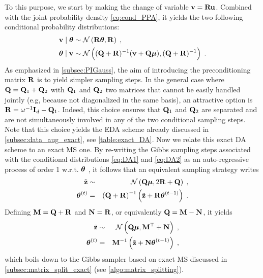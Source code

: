 \documentclass[nohypdvips,onefignum,onetabnum]{siamart171218}
\begin{document}
To this purpose, we start by making the change of variable $\mathbf{v} = \mathbf{Ru}$. Combined with the joint probability density \cref{eq:cond_PPA}, it yields the two following conditional probability distributions:
\begin{align}
  \B{v}\mid\Bs{\theta} &\sim \mathcal{N}\pr{\B{R}\Bs{\theta},\B{R}}\eqsp, \label{eq:DA1}\\
  \Bs{\theta}\mid\B{v} &\sim \mathcal{N}\pr{(\B{Q} + \B{R})^{-1}(\B{v}+\B{Q}\Bs{\mu}),(\B{Q} + \B{R})^{-1}}\eqsp.\label{eq:DA2}
\end{align}
As emphasized in \cref{subsec:PIGauss}, the aim of introducing the preconditioning matrix $\mathbf{R}$ is to yield simpler sampling steps.
In the general case where $\mathbf{Q} = \mathbf{Q}_1 + \mathbf{Q}_2$ with $\mathbf{Q}_1$ and $\mathbf{Q}_2$ two matrices that cannot be easily handled jointly (e.g, because not diagonalized in the same basis),
an attractive option is $\mathbf{R} = \omega^{-1}\mathbf{I}_d - \mathbf{Q}_1$.
Indeed, this choice ensures that $\mathbf{Q}_1$ and $\mathbf{Q}_2$ are separated and are not simultaneously involved in any of the two conditional sampling steps.
Note that this choice yields the EDA scheme already discussed in \cref{subsec:data_aug_exact}, see \cref{table:exact_DA}.
%
Now we relate this exact DA scheme to an exact MS one. 
By re-writing the Gibbs sampling steps associated with the conditional distributions \cref{eq:DA1} and \cref{eq:DA2} as an auto-regressive process of order 1 w.r.t. $\boldsymbol{\theta}$ \cite{Box1994}, it follows that an equivalent sampling strategy writes 
\begin{eqnarray}
  \tilde{\mathbf{z}} &\sim & \mathcal{N}\left(\mathbf{Q}\boldsymbol{\mu}, 2\mathbf{R} + \mathbf{Q}\right)\;,\\
  \boldsymbol{\theta}^{(t)} & = & \left(\mathbf{Q}+\mathbf{R}\right)^{-1}\left(\tilde{\mathbf{z}}+\mathbf{R}\boldsymbol{\theta}^{(t-1)}\right)\;.
\end{eqnarray}
Defining $\mathbf{M} = \mathbf{Q}+\mathbf{R}$ and $\mathbf{N} = \mathbf{R}$, or equivalently $\mathbf{Q} = \mathbf{M} - \mathbf{N}$, it yields  
\begin{eqnarray}
    \tilde{\B{z}} & \sim & \mathcal{N}\pr{\B{Q}\Bs{\mu}, \B{M}^{\top} + \B{N}}\eqsp,\label{eq:z}\\
    \Bs{\theta}^{(t)} & = & \B{M}^{-1}\pr{\tilde{\B{z}} + \B{N}\Bs{\theta}^{(t-1)}}\eqsp,
\end{eqnarray}
which boils down to the Gibbs sampler based on exact MS  discussed in \cref{subsec:matrix_split_exact} (see \cref{algo:matrix_splitting}). 
\end{document}
